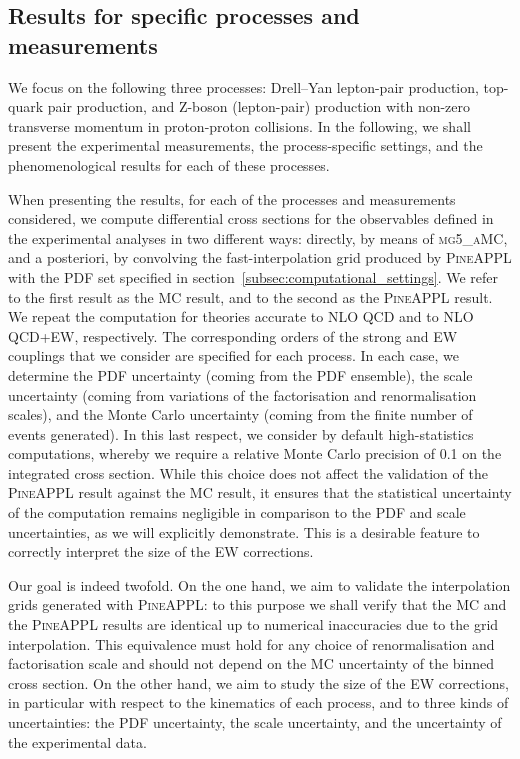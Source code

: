 \subsection{Results for specific processes and measurements}
\label{subsec:processes_and_measurements}

We focus on the following three processes: Drell--Yan lepton-pair production,
top-quark pair production, and Z-boson (lepton-pair) production with non-zero
transverse momentum in proton-proton collisions. In the following, we shall
present the experimental measurements, the process-specific settings, and
the phenomenological results for each of these processes.

When presenting the results, for each of the processes and measurements considered, we compute differential
cross sections for the observables defined in the experimental analyses in two different
ways: directly, by means of \textsc{mg5\_aMC}, and a posteriori, by convolving
the fast-interpolation grid produced by \textsc{PineAPPL} with the PDF set
specified in section~\ref{subsec:computational_settings}. We
refer to the first result as the MC result, and to the second as
the \textsc{PineAPPL} result. We repeat the computation for theories accurate
to NLO QCD and to NLO QCD+EW, respectively. The corresponding orders of the
strong and EW couplings that we consider are specified for each process. In each case, we determine the
PDF uncertainty (coming from the PDF ensemble), the scale uncertainty (coming
from variations of the factorisation and renormalisation scales), and the Monte
Carlo uncertainty (coming from the finite number of events generated). In this
last respect, we consider by default high-statistics computations, whereby we
require a relative Monte Carlo precision of \SI{0.1}{\permille} on the integrated cross section. While
this choice does not affect the validation of the \textsc{PineAPPL} result
against the MC result, it ensures that the statistical uncertainty of
the computation remains negligible in comparison to the PDF and scale
uncertainties, as we will explicitly demonstrate. This is a desirable feature
to correctly interpret the size of the EW corrections.

Our goal is indeed twofold. On the one hand, we aim to validate the
interpolation grids generated with \textsc{PineAPPL}: to this purpose we shall
verify that the MC and the \textsc{PineAPPL} results are identical up to
numerical inaccuracies due to the grid interpolation. This equivalence must
hold for any choice of renormalisation and factorisation scale and should not
depend on the MC uncertainty of the binned cross section. On the other
hand, we aim to study the size of the EW corrections, in particular with
respect to the kinematics of each process, and to three kinds of uncertainties:
the PDF uncertainty, the scale uncertainty, and the uncertainty of the
experimental data.

